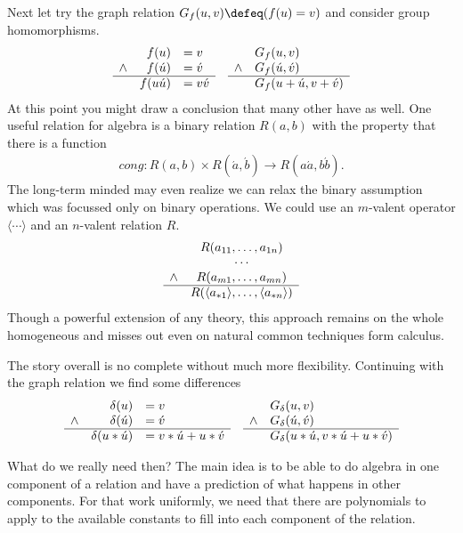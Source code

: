 Next let try the graph relation $G_f(u,v)\defeq (f(u)=v)$
and consider group homomorphisms.
\begin{align*}
\begin{array}{crl}
        & f(u) & = v\\
    \wedge & f(\acute{u}) & =\acute{v}\\
    \hline 
        & f(u\acute{u}) & = v\acute{v}
\end{array}
    & & 
\begin{array}{cl}
        & G_f(u,v)\\
    \wedge & G_f(\acute{u},\acute{v})\\
    \hline 
        & G_f(u+\acute{u},v+\acute{v})
\end{array}
\end{align*}
At this point you might draw a conclusion that many other have as 
well.  One useful relation for algebra is a binary relation $R(a,b)$
with the property that there is a function 
\begin{align*}
    cong:R(a,b)\times R(\acute{a},\acute{b})\to R(a\acute{a},b\acute{b}).
\end{align*}
The long-term minded may even realize we can relax the binary assumption 
which was focussed only on binary operations.  We could use an 
$m$-valent operator $\langle\cdots\rangle$ and an $n$-valent relation $R$.
\begin{align*}
    \begin{array}{cc}
        & R(a_{11},\ldots,a_{1n})\\
        & \cdots \\
    \wedge    & R(a_{m1},\ldots,a_{mn})\\
    \hline 
        & R(\langle a_{*1}\rangle,\ldots,\langle a_{*n}\rangle)
    \end{array}
\end{align*}
Though a powerful extension of any theory, this approach remains on the 
whole homogeneous and misses out even on natural common techniques form 
calculus.

The story overall is no complete without much more flexibility.
Continuing with the graph relation we find some differences
\begin{align*}
    \begin{array}{crl}
        & \delta(u) & =v\\
    \wedge &\delta(\acute{u}) & =\acute{v}\\
    \hline 
        & \delta(u*\acute{u}) & =v*\acute{u}+u*\acute{v}
    \end{array}
&&
    \begin{array}{cl}
        & G_{\delta}(u,v)\\
    \wedge & G_{\delta}(\acute{u},\acute{v})\\
    \hline 
        & G_{\delta}(u*\acute{u},v*\acute{u}+u*\acute{v})
    \end{array}
\end{align*}

What do we really need then?  The main idea is to be able to do 
algebra in one component of a relation and have a prediction of 
what happens in other components.  For that work uniformly, we need 
that there are polynomials to apply to the available constants to fill 
into each component of the relation.